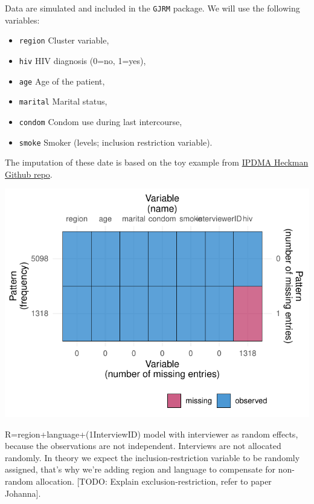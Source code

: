\documentclass[
]{jss}
\providecommand{\tightlist}{%
  \setlength{\itemsep}{0pt}\setlength{\parskip}{0pt}}
\begin{document}
Data are simulated and included in the \texttt{GJRM} package. We will
use the following variables:

\begin{itemize}
\tightlist
\item
  \texttt{region} Cluster variable,
\item
  \texttt{hiv} HIV diagnosis (0=no, 1=yes),
\item
  \texttt{age} Age of the patient,
\item
  \texttt{marital} Marital status,
\item
  \texttt{condom} Condom use during last intercourse,
\item
  \texttt{smoke} Smoker (levels; inclusion restriction variable).
\end{itemize}

The imputation of these date is based on the toy example from
\href{https://github.com/johamunoz/Heckman-IPDMA/blob/main/Toy_example.R}{IPDMA
Heckman Github repo}.

\begin{CodeChunk}


\begin{center}\includegraphics{Imputation_of_Incomplete_Multilevel_Data_files/figure-latex/hiv-1} \end{center}

\end{CodeChunk}

R=region+language+(1\textbar InterviewID) model with interviewer as
random effects, because the observations are not independent. Interviews
are not allocated randomly. In theory we expect the
inclusion-restriction variable to be randomly assigned, that's why we're
adding region and language to compensate for non-random allocation.
{[}TODO: Explain exclusion-restriction, refer to paper Johanna{]}.
\end{document}
